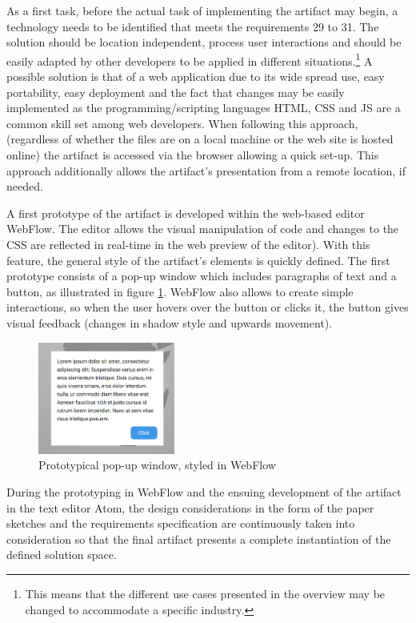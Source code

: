As a first task, before the actual task of implementing the artifact may begin, a technology needs to be identified that meets the requirements 29 to 31. The solution should be location independent, process user interactions and should be easily adapted by other developers to be applied in different situations.\footnote{This means that the different use cases presented in the overview may be changed to accommodate a specific industry.} A possible solution is that of a web application due to its wide spread use, easy portability, easy deployment and the fact that changes may be easily implemented as the programming/scripting languages \ac{HTML}, \ac{CSS} and \acl{JS} are a common skill set among web developers. When following this approach, (regardless of whether the files are on a local machine or the web site is hosted online) the artifact is accessed via the browser allowing a quick set-up. This approach additionally allows the artifact's presentation from a remote location, if needed.

A first prototype of the artifact is developed within the web-based editor WebFlow. The editor allows the visual manipulation of code and changes to the \ac{CSS} are reflected in real-time in the web preview of the editor). With this feature, the general style of the artifact's elements is quickly defined. The first prototype consists of a pop-up window which includes paragraphs of text and a button, as illustrated in figure \ref{fig:proto1}. WebFlow also allows to create simple interactions, so when the user hovers over the button or clicks it, the button gives visual feedback (changes in shadow style and upwards movement).

\begin{figure}
    \centering
    \includegraphics[width=0.4\textwidth]{latex-vorlage_v1.5/graphics/Prototype1.png}
    \caption{Prototypical pop-up window, styled in WebFlow}
    \label{fig:proto1}
\end{figure}

During the prototyping in WebFlow and the ensuing development of the artifact in the text editor Atom, the design considerations in the form of the paper sketches and the requirements specification are continuously taken into consideration so that the final artifact presents a complete instantiation of the defined solution space.

